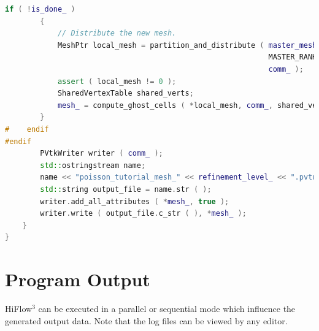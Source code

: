 \documentclass[a4paper, 11pt, twoside]{article}
\begin{document}
\begin{lstlisting}[language=C++, basicstyle={\footnotesize, \ttfamily}, keywordstyle=\color{blue}, numbers=none, tabsize=4]
        if ( !is_done_ )
        {
            // Distribute the new mesh.
            MeshPtr local_mesh = partition_and_distribute ( master_mesh_, 
                                                            MASTER_RANK, 
                                                            comm_ );
            assert ( local_mesh != 0 );
            SharedVertexTable shared_verts;
            mesh_ = compute_ghost_cells ( *local_mesh, comm_, shared_verts );
        }
#    endif
#endif
        PVtkWriter writer ( comm_ );
        std::ostringstream name;
        name << "poisson_tutorial_mesh_" << refinement_level_ << ".pvtu";
        std::string output_file = name.str ( );
        writer.add_all_attributes ( *mesh_, true );
        writer.write ( output_file.c_str ( ), *mesh_ );
    }
}
\end{lstlisting}

\section{Program Output}
HiFlow$^3$ can be executed in a parallel or sequential mode which influence the generated output data. Note that the log files can be viewed by any editor.
\end{document}
